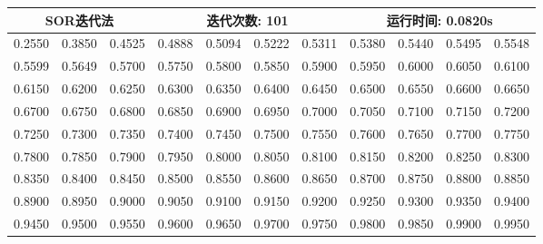 \documentclass{article}
\begin{document}
\begin{table}[H]
\begin{tabular}{|*{11}{c}|}
		\multicolumn{3}{|c}{\textbf{SOR迭代法}} & \multicolumn{4}{|c}{迭代次数: 101}\ & \multicolumn{4}{|c|}{运行时间: 0.0820s}\\
		\hline
		0.2550 & 0.3850 & 0.4525 & 0.4888 & 0.5094 & 0.5222 & 0.5311 & 0.5380 & 0.5440 & 0.5495 & 0.5548 \\
		0.5599 & 0.5649 & 0.5700 & 0.5750 & 0.5800 & 0.5850 & 0.5900 & 0.5950 & 0.6000 & 0.6050 & 0.6100 \\
		0.6150 & 0.6200 & 0.6250 & 0.6300 & 0.6350 & 0.6400 & 0.6450 & 0.6500 & 0.6550 & 0.6600 & 0.6650 \\
		0.6700 & 0.6750 & 0.6800 & 0.6850 & 0.6900 & 0.6950 & 0.7000 & 0.7050 & 0.7100 & 0.7150 & 0.7200 \\
		0.7250 & 0.7300 & 0.7350 & 0.7400 & 0.7450 & 0.7500 & 0.7550 & 0.7600 & 0.7650 & 0.7700 & 0.7750 \\
		0.7800 & 0.7850 & 0.7900 & 0.7950 & 0.8000 & 0.8050 & 0.8100 & 0.8150 & 0.8200 & 0.8250 & 0.8300 \\
		0.8350 & 0.8400 & 0.8450 & 0.8500 & 0.8550 & 0.8600 & 0.8650 & 0.8700 & 0.8750 & 0.8800 & 0.8850 \\
		0.8900 & 0.8950 & 0.9000 & 0.9050 & 0.9100 & 0.9150 & 0.9200 & 0.9250 & 0.9300 & 0.9350 & 0.9400 \\
		0.9450 & 0.9500 & 0.9550 & 0.9600 & 0.9650 & 0.9700 & 0.9750 & 0.9800 & 0.9850 & 0.9900 & 0.9950 \\
		\hline
	\end{tabular}
\end{table}
\end{document}
